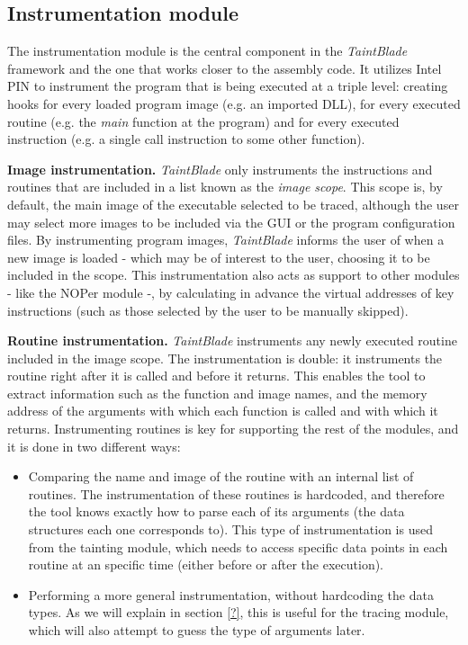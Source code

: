 \documentclass[conference]{IEEEtran}
\begin{document}
\subsection{Instrumentation module}
The instrumentation module is the central component in the \textit{TaintBlade}
framework and the one that works closer to the assembly code. It utilizes Intel
PIN to instrument the program that is being executed at a triple level:
creating hooks for every loaded program image (e.g. an imported DLL), for every
executed routine (e.g. the \textit{main} function at the program) and for every
executed instruction (e.g. a single call instruction to some other function).

\textbf{Image instrumentation.}
\textit{TaintBlade} only instruments the instructions and routines that are included
in a list known as the \textit{image scope}. This scope is, by default, the main image of the executable
selected to be traced, although the user may select more images to be included via the GUI or
the program configuration files. By instrumenting program images, \textit{TaintBlade} informs the
user of when a new image is loaded - which may be of interest to the user, choosing it to be included
in the scope. This instrumentation also acts as support to other modules - like the NOPer module -, by calculating in
advance the virtual addresses of key instructions (such as those selected by the user to be manually skipped).

\textbf{Routine instrumentation.}
\textit{TaintBlade} instruments any newly executed routine included in the image scope. The instrumentation is double: it instruments
the routine right after it is called and before it returns. This enables
the tool to extract information such as the function and image names, and the memory address of the arguments with which each
function is called and with which it returns. Instrumenting routines is key for supporting the rest of the modules, and it is done in two different ways:

\begin{itemize}
    \item Comparing the name and image of the routine with an internal list of routines.
          The instrumentation of these routines is hardcoded, and therefore the tool
          knows exactly how to parse each of its arguments (the data structures each one
          corresponds to). This type of instrumentation is used from the tainting module,
          which needs to access specific data points in each routine at an specific time
          (either before or after the execution).
    \item Performing a more general instrumentation, without hardcoding the data types.
          As we will explain in section \ref{?}, this is useful for the tracing module,
          which will also attempt to guess the type of arguments later.
\end{itemize}
\end{document}
